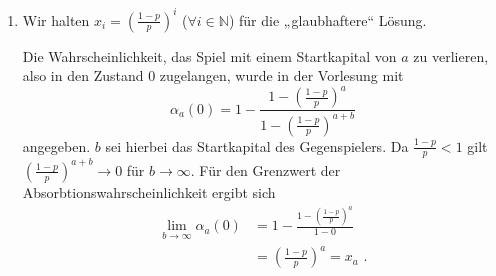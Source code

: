 \documentclass[a4paper]{scrartcl}
\newcommand{\N}{\mathbb{N}}
\def \blattnr {3}
\begin{document}
\begin{enumerate}[label=\bfseries \blattnr.\arabic*]
\begin{enumerate}[label=\alph*)]
\begin{proof}
\begin{equation*}
\begin{split}
                            &= (1-p) + p \cdot \left(\frac{1-p}{p}\right)^2 \\
                            &= (1-p) + \frac{(1-p)^2}{p} \\
                            &= \frac{p -p^2 +1 -2p +p^2}{p} \\
                            &= \frac{1-p}{p} \\
                            &= \left(\frac{1-p}{p}\right)^1 = x_1
                        \end{split}
                    \end{equation*}
                    $x_i = \left(\frac{1-p}{p}\right)^i$ für alle $i \in \N$
                    ist also eine Lösung des linearen Gleichungssystems.
                \end{proof}

            \item
                Wir halten $x_i = \left( \frac{1-p}{p} \right)^i$ ($\forall i
                \in \N$) für die „glaubhaftere“ Lösung.

                Die Wahrscheinlichkeit, das Spiel mit einem Startkapital von
                $a$ zu verlieren, also in den Zustand $0$ zugelangen, wurde in
                der Vorlesung mit
                \begin{equation*}
                    \alpha_a(0)
                    = 1 - \frac{1 - \left( \frac{1-p}{p} \right)^a}
                               {1 - \left( \frac{1-p}{p} \right)^{a+b}}
                \end{equation*}
                angegeben. $b$ sei hierbei das Startkapital des Gegenspielers.
                Da $\frac{1-p}{p} < 1$ gilt $\left( \frac{1-p}{p} \right)^{a+b}
                \to 0$ für $b \to \infty$.
                Für den Grenzwert der Absorbtionswahrscheinlichkeit ergibt sich
                \begin{equation*}
                    \begin{split}
                        \lim_{b \to \infty} \alpha_a(0)
                        &= 1 - \frac{1 - \left( \frac{1-p}{p} \right)^a}
                                    {1 - 0} \\
                        &= \left( \frac{1-p}{p} \right)^a = x_a
                        \text{ .}
                    \end{split}
                \end{equation*}

        \end{enumerate}


\end{enumerate}
\end{document}
